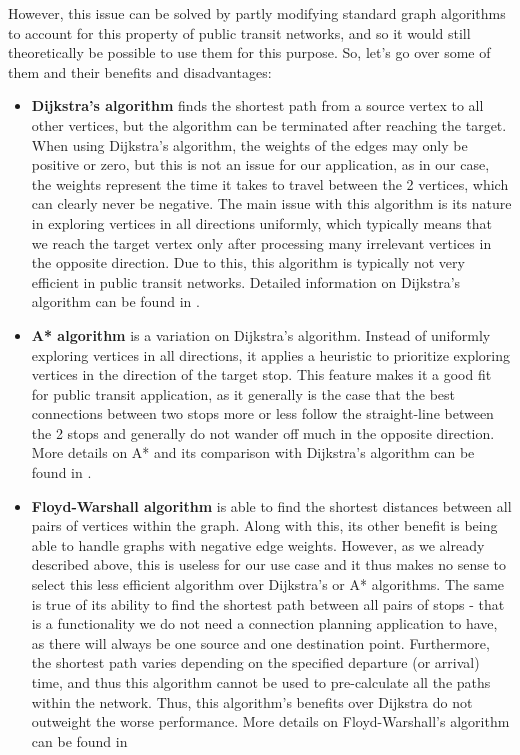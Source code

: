 However, this issue can be solved by partly modifying standard graph algorithms to account for this property of public transit networks, and so it would still theoretically be possible to use them for this purpose. So, let's go over some of them and their benefits and disadvantages:

\begin{itemize}
    \item \textbf{Dijkstra's algorithm} finds the shortest path from a source vertex to all other vertices, but the algorithm can be terminated after reaching the target\cite[pp. 146--152]{mares2017pruvodce}. When using Dijkstra's algorithm, the weights of the edges may only be positive or zero, but this is not an issue for our application, as in our case, the weights represent the time it takes to travel between the 2 vertices, which can clearly never be negative. The main issue with this algorithm is its nature in exploring vertices in all directions uniformly, which typically means that we reach the target vertex only after processing many irrelevant vertices in the opposite direction. Due to this, this algorithm is typically not very efficient in public transit networks. Detailed information on Dijkstra's algorithm can be found in \textcite[pp. 146--152]{mares2017pruvodce}.

    \item \textbf{A* algorithm} is a variation on Dijkstra's algorithm. Instead of uniformly exploring vertices in all directions, it applies a heuristic to prioritize exploring vertices in the direction of the target stop. This feature makes it a good fit for public transit application, as it generally is the case that the best connections between two stops more or less follow the straight-line between the 2 stops and generally do not wander off much in the opposite direction. More details on A* and its comparison with Dijkstra's algorithm can be found in \textcite[pp. 156--160]{mares2017pruvodce}.

    \item \textbf{Floyd-Warshall algorithm} is able to find the shortest distances between all pairs of vertices within the graph. Along with this, its other benefit is being able to handle graphs with negative edge weights\cite[pp. 154--155]{mares2017pruvodce}. However, as we already described above, this is useless for our use case and it thus makes no sense to select this less efficient algorithm over Dijkstra's or A* algorithms. The same is true of its ability to find the shortest path between all pairs of stops - that is a functionality we do not need a connection planning application to have, as there will always be one source and one destination point. Furthermore, the shortest path varies depending on the specified departure (or arrival) time, and thus this algorithm cannot be used to pre-calculate all the paths within the network. Thus, this algorithm's benefits over Dijkstra do not outweight the worse performance. More details on Floyd-Warshall's algorithm can be found in  \textcite[pp. 154--155]{mares2017pruvodce}
    

\end{itemize}
